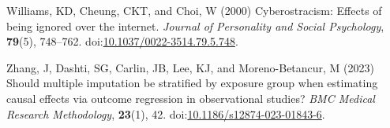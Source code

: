 \documentclass[
  singlecolumn,
  9pt]{scrartcl}
\newlength{\cslhangindent}
\newenvironment{CSLReferences}[2] %
 {\begin{list}{}{%
  \setlength{\itemindent}{0pt}
  \setlength{\leftmargin}{0pt}
  \setlength{\parsep}{0pt}
  \ifodd #1
   \setlength{\leftmargin}{\cslhangindent}
   \setlength{\itemindent}{-1\cslhangindent}
  \fi
  \setlength{\itemsep}{#2\baselineskip}}}
 {\end{list}}
\begin{document}
\begin{CSLReferences}{1}{0}
Williams, KD, Cheung, CKT, and Choi, W (2000) Cyberostracism: Effects of
being ignored over the internet. \emph{Journal of Personality and Social
Psychology}, \textbf{79}(5), 748--762.
doi:\href{https://doi.org/10.1037/0022-3514.79.5.748}{10.1037/0022-3514.79.5.748}.

Zhang, J, Dashti, SG, Carlin, JB, Lee, KJ, and Moreno-Betancur, M (2023)
Should multiple imputation be stratified by exposure group when
estimating causal effects via outcome regression in observational
studies? \emph{BMC Medical Research Methodology}, \textbf{23}(1), 42.
doi:\href{https://doi.org/10.1186/s12874-023-01843-6}{10.1186/s12874-023-01843-6}.

\end{CSLReferences}
\end{document}
